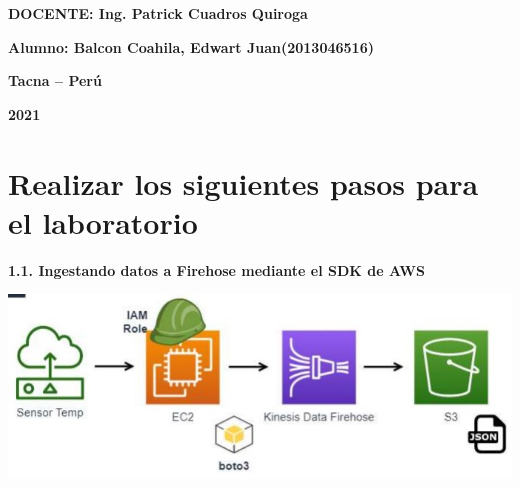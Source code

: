 \documentclass{article}
\begin{document}
\begin{titlepage}
\begin{center}
\vspace*{0.3in}
\begin{Large}
\textbf{DOCENTE: Ing. Patrick Cuadros Quiroga} \\
\end{Large}

\vspace*{0.2in}
\vspace*{0.1in}
\begin{large}

\begin{Large}
\textbf{Alumno: Balcon Coahila, Edwart Juan\hfill	(2013046516) } \\
\end{Large}

\vspace*{0.15in}
\begin{Large}
\textbf{Tacna – Perú} \\
\end{Large}

\vspace*{0.05in}
\begin{Large}
\textbf{2021 } \\
\end{Large}

\end{large}
\end{center}

\end{titlepage}


\newpage

\section{ Realizar los siguientes pasos para el laboratorio }

\textbf{1.1. Ingestando datos a Firehose mediante el SDK de AWS}

    \begin{center}
		\includegraphics[width=15cm]{./images/1} 
	\end{center}
	
\end{document}
